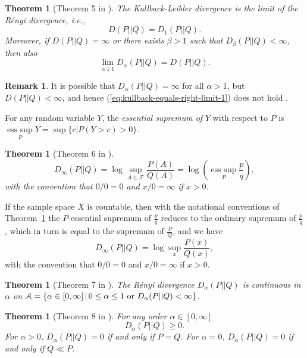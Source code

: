\documentclass[12pt,a4paper,oneside]{article}
\numberwithin{equation}{section}
\theoremstyle{definition}  %
\newtheorem{rmk}[defn]{Remark}
\theoremstyle{plain}  %
\newtheorem{thm}[defn]{Theorem}
\theoremstyle{remark} %
\begin{document}
\begin{thm}[Theorem 5 in \cite{Erven-Harremos-2014}]\label{thm:5-veh}
The Kullback-Leibler divergence is the limit of the R\'enyi divergence, i.e.,
\begin{equation}\label{eq:kullback-equals-left-limit-1}
    D(P||Q)= D_1(P||Q).
\end{equation}
Moreover, if $D(P||Q) = \infty$ or there exists $\beta>1$ such that $D_\beta (P||Q)<\infty$, then also \begin{equation}\label{eq:kullback-equals-right-limit-1}
    \lim\limits_{\alpha \downarrow 1} D_{\alpha}(P||Q) = D(P||Q).
\end{equation}
\end{thm}
\begin{rmk}
It is possible that $D_{\alpha}(P||Q) = \infty$ for all $\alpha>1$, but $D(P||Q)< \infty$, and hence (\ref{eq:kullback-equals-right-limit-1}) does not hold \cite{Erven-Harremos-2014}.
\end{rmk}
For any random variable $Y$, the \emph{essential supremum of} $Y$ with respect to $P$ is $\underset{P}{\operatorname{ess\ sup}}  Y = \sup\{c|P(Y>c)>0\}$.
\begin{thm}
[Theorem 6 in \cite{Erven-Harremos-2014}]\label{thm:6-veh}
\begin{equation}
 \label{eq:limit-infty}
 D_{\infty}(P||Q) = \log \underset{A\in \mathcal{F}}{\sup}\frac{P(A)}{Q(A)} = \log \left(\underset{P}{\operatorname{ess\ sup}} \frac{p}{q}\right),
\end{equation}
with the convention that $0/0 = 0$ and $x/0 = \infty$ if $x>0$.
\end{thm}
If the sample space $X$ is countable, then with the notational conventions of  Theorem~\ref{thm:6-veh} the 
$P$-essential supremum of $\frac{p}{q}$ reduces to the ordinary supremum of $\frac{p}{q}$, which in turn is equal to the 
supremum of $\frac{P}{Q}$, and we have 
\begin{equation}\label{eq:limit-infty-countable-sample-space}
    D_{\infty}(P||Q) = \log   \sup_x \frac{P(x)}{Q(x)},
\end{equation}
with the convention that $0/0 = 0$ and $x/0 = \infty$ if $x>0$.
\begin{thm}
[Theorem 7 in \cite{Erven-Harremos-2014}]\label{thm:7-veh}
The R\'enyi divergence $D_\alpha (P||Q)$ is continuous in $\alpha$ on $\mathcal{A} = \{\alpha\in [0,\infty]\,|\, 0\leq \alpha\leq 1\textnormal{ or } D_{\alpha}(P||Q)<\infty\}$.
\end{thm}
\begin{thm}
[Theorem 8 in \cite{Erven-Harremos-2014}]\label{thm:8-veh} For any order $\alpha\in [0,\infty]$ 
\[D_{\alpha}(P||Q)\geq 0.\] For $\alpha>0$, $D_{\alpha}(P||Q) = 0$ if and only if $P=Q$. For $\alpha = 0$, $D_{\alpha}(P||Q) = 0$ if and only if $Q\ll P$.
\end{thm}
\end{document}
